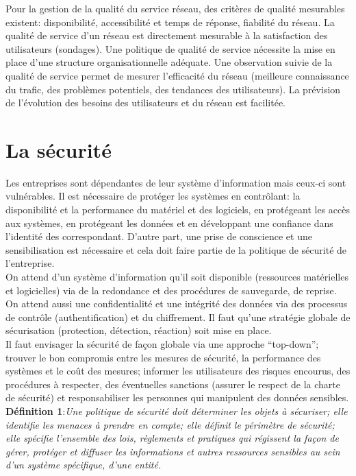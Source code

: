 \documentclass[10pt,a4paper,oneside,titlepage]{report}
\begin{document}
Pour la gestion de la qualité du service réseau, des critères de qualité
mesurables existent: disponibilité, accessibilité et temps de réponse,
fiabilité du réseau. La qualité de service d’un réseau est directement mesurable
à la satisfaction des utilisateurs (sondages). Une politique de qualité de
service nécessite la mise en place d’une structure organisationnelle adéquate.
Une observation suivie de la qualité de service permet de mesurer l’efficacité
du réseau (meilleure connaissance du trafic, des problèmes potentiels, des
tendances des utilisateurs). La prévision de l’évolution des besoins des
utilisateurs et du réseau est facilitée.

\section{La sécurité}
Les entreprises sont dépendantes de leur système d’information mais ceux-ci sont
vulnérables. Il est nécessaire de protéger les systèmes en contrôlant: la
disponibilité et la performance du matériel et des logiciels, en protégeant les
accès aux systèmes, en protégeant les données et en développant une confiance
dans l'identité des correspondant. D'autre part, une prise de conscience et une
sensibilisation est nécessaire et cela doit faire partie de la politique de
sécurité de l'entreprise.\\

On attend d'un système d'information qu'il soit disponible (ressources
matérielles et logicielles) via de la redondance et des procédures de
sauvegarde, de reprise. On attend aussi une confidentialité et une intégrité
des données via des processus de contrôle (authentification) et du chiffrement.
Il faut qu'une stratégie globale de sécurisation (protection, détection,
réaction) soit mise en place.\\

Il faut envisager la sécurité de façon globale via une approche ``top-down'';
trouver le bon compromis entre les mesures de sécurité, la performance des
systèmes et le coût des mesures; informer les utilisateurs des risques encourus,
des procédures à respecter, des éventuelles sanctions (assurer le respect de la
charte de sécurité) et responsabiliser les personnes qui manipulent des données
sensibles.\\

\noindent
\textbf{Définition 1}:\emph{Une politique de sécurité doit déterminer les objets
à sécuriser; elle identifie les menaces à prendre en compte; elle définit le
périmètre de sécurité; elle spécifie l’ensemble des lois, règlements et
pratiques qui régissent la façon de gérer, protéger et diffuser les informations
et autres ressources sensibles au sein d’un système spécifique, d’une entité.}\\
\end{document}
